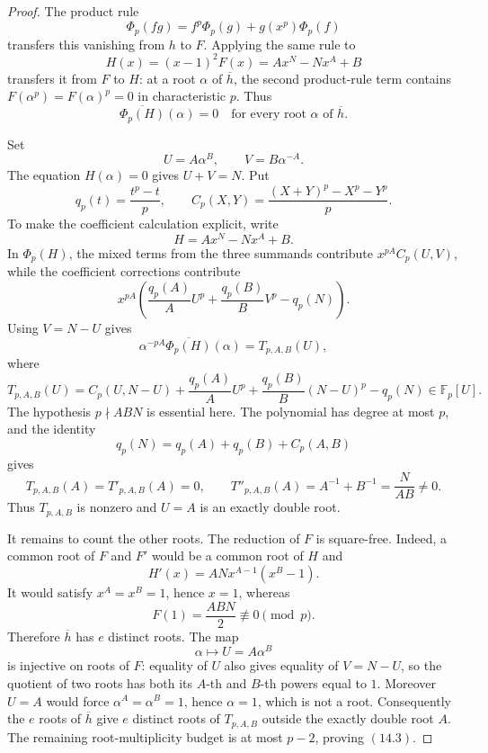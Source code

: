 \documentclass[11pt]{article}
\theoremstyle{definition}
\begin{document}
\begin{proof}
The product rule
\[
 \Phi_p(fg)=f^p\Phi_p(g)+g(x^p)\Phi_p(f)
\]
transfers this vanishing from \(h\) to \(F\).  Applying the
same rule to
\[
 H(x)=(x-1)^2F(x)=Ax^N-Nx^A+B
\]
transfers it from \(F\) to \(H\): at a root \(\alpha\) of
\(\overline h\), the second product-rule term contains
\(F(\alpha^p)=F(\alpha)^p=0\) in characteristic \(p\).  Thus
\[
 \overline{\Phi_p(H)}(\alpha)=0
 \quad\text{for every root }\alpha\text{ of }\overline h.
\]

Set
\[
 U=A\alpha^B,\qquad V=B\alpha^{-A}.
\]
The equation \(H(\alpha)=0\) gives \(U+V=N\).  Put
\[
 q_p(t)=\frac{t^p-t}{p},\qquad
 C_p(X,Y)=\frac{(X+Y)^p-X^p-Y^p}{p}.
\]
To make the coefficient calculation explicit, write
\[
 H=Ax^N-Nx^A+B.
\]
In \(\Phi_p(H)\), the mixed terms from the three summands contribute
\(x^{pA}C_p(U,V)\), while the coefficient corrections contribute
\[
 x^{pA}\left(\frac{q_p(A)}A U^p
 +\frac{q_p(B)}B V^p-q_p(N)\right).
\]
Using \(V=N-U\) gives
\begin{equation}
 \alpha^{-pA}\overline{\Phi_p(H)}(\alpha)
 =T_{p,A,B}(U),
 \tag{14.6}
\end{equation}
where
\begin{equation}
 T_{p,A,B}(U)=
 C_p(U,N-U)
 +\frac{q_p(A)}A U^p
 +\frac{q_p(B)}B(N-U)^p
 -q_p(N)
 \in\mathbb F_p[U].
 \tag{14.7}
\end{equation}
The hypothesis \(p\nmid ABN\) is essential here.  The polynomial has degree
at most \(p\), and the identity
\[
 q_p(N)=q_p(A)+q_p(B)+C_p(A,B)
\]
gives
\[
 T_{p,A,B}(A)=T'_{p,A,B}(A)=0,
 \qquad
 T''_{p,A,B}(A)=A^{-1}+B^{-1}=\frac N{AB}\neq0.
\]
Thus \(T_{p,A,B}\) is nonzero and \(U=A\) is an exactly double root.

It remains to count the other roots.  The reduction of \(F\) is square-free.
Indeed, a common root of \(F\) and \(F'\) would be a common root of \(H\)
and
\[
 H'(x)=ANx^{A-1}(x^B-1).
\]
It would satisfy \(x^A=x^B=1\), hence \(x=1\), whereas
\[
 F(1)=\frac{ABN}{2}\not\equiv0\pmod p.
\]
Therefore \(\overline h\) has \(e\) distinct roots.  The map
\[
 \alpha\longmapsto U=A\alpha^B
\]
is injective on roots of \(F\): equality of \(U\) also gives equality of
\(V=N-U\), so the quotient of two roots has both its \(A\)-th and
\(B\)-th powers equal to \(1\).  Moreover \(U=A\) would force
\(\alpha^A=\alpha^B=1\), hence \(\alpha=1\), which is not a root.
Consequently the \(e\) roots of \(\overline h\) give \(e\) distinct roots
of \(T_{p,A,B}\) outside the exactly double root \(A\).  The remaining
root-multiplicity budget is at most \(p-2\), proving \((14.3)\).
\end{proof}
\end{document}
